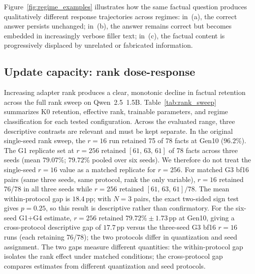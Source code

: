 \documentclass[a4paper,fleqn]{cas-dc}
\newif\ifshowchanges
\newcommand{\rev}[1]{\ifshowchanges{\color{blue}#1}\else{#1}\fi}
\begin{document}
Figure~\ref{fig:regime_examples} illustrates how the same factual question
produces qualitatively different response trajectories across regimes: in~(a),
the correct answer persists unchanged; in~(b), the answer remains correct but
becomes embedded in increasingly verbose filler text; in~(c), the factual
content is progressively displaced by unrelated or fabricated information.

\subsection{Update capacity: rank dose-response}\label{sec:res_capacity}

Increasing adapter rank produces a clear, monotonic decline in factual retention
across the full rank sweep on Qwen~2.5~1.5B.
Table~\ref{tab:rank_sweep} summarizes K0 retention, effective rank, trainable
parameters, and regime classification for each tested configuration. Across the evaluated range, three descriptive contrasts are relevant and must be kept separate.
\rev{In the original single-seed rank sweep, the $r=16$ run retained 75 of 78
facts at Gen10 ($96.2\%$). The G1 replicate set at $r=256$ retained
$[61,\,63,\,61]$ of 78 facts across three seeds (mean $\rev{79.07\%}$; $\rev{79.72\%}$ pooled over six seeds). We therefore do not treat the single-seed $r=16$ value as a matched
replicate for $r=256$.}
\rev{For matched G3 bf16 pairs (same three seeds, same protocol, rank the only
variable), $r=16$ retained 76/78 in all three seeds while $r=256$ retained
$[61,\,63,\,61]/78$. The mean within-protocol gap is $18.4$\,pp; with $N{=}3$
pairs, the exact two-sided sign test gives $p{=}0.25$, so this result is
descriptive rather than confirmatory.}
\rev{For the six-seed G1$+$G4 estimate, $r=256$ retained
$79.72\%\pm1.73$\,pp at Gen10, giving a cross-protocol
descriptive gap of $17.7$\,pp versus the three-seed G3 bf16 $r=16$ runs (each retaining 76/78); the two
protocols differ in quantization and seed assignment. \rev{The two gaps measure different quantities: the within-protocol gap isolates the rank effect under matched conditions; the cross-protocol gap compares estimates from different quantization and seed protocols.}}
\end{document}
